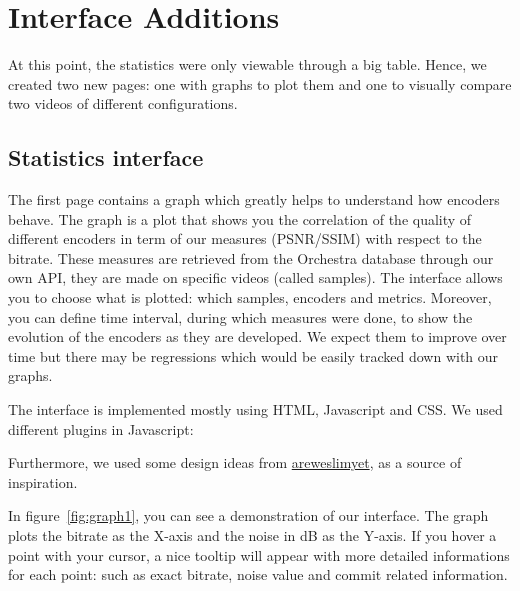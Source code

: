 \documentclass[a4paper,12pt]{article}
\begin{document}
\section{Interface Additions}
At this point, the statistics were only viewable through a big table.
Hence, we created two new pages: one with graphs to plot them and one to visually compare two videos of different configurations.

\subsection{Statistics interface}
The first page contains a graph which greatly helps to understand how encoders behave.
The graph is a plot that shows you the correlation of the quality of different encoders in term of our measures (PSNR/SSIM) with respect to the bitrate.
These measures are retrieved from the Orchestra database through our own API, they are made on specific videos (called samples).
The interface allows you to choose what is plotted: which samples, encoders and metrics.
Moreover, you can define time interval, during which measures were done, to show the evolution of the encoders as they are developed.
We expect them to improve over time but there may be regressions which would be easily tracked down with our graphs.

The interface is implemented mostly using HTML, Javascript and CSS.
We used different plugins in Javascript:
Furthermore, we used some design ideas from \href{http://areweslimyet.com}{areweslimyet}, as a source of inspiration.

In figure~\ref{fig:graph1}, you can see a demonstration of our interface.
The graph plots the bitrate as the X-axis and the noise in dB as the Y-axis.
If you hover a point with your cursor, a nice tooltip will appear with more detailed informations for each point: such as exact bitrate, noise value and commit related information.
\end{document}

